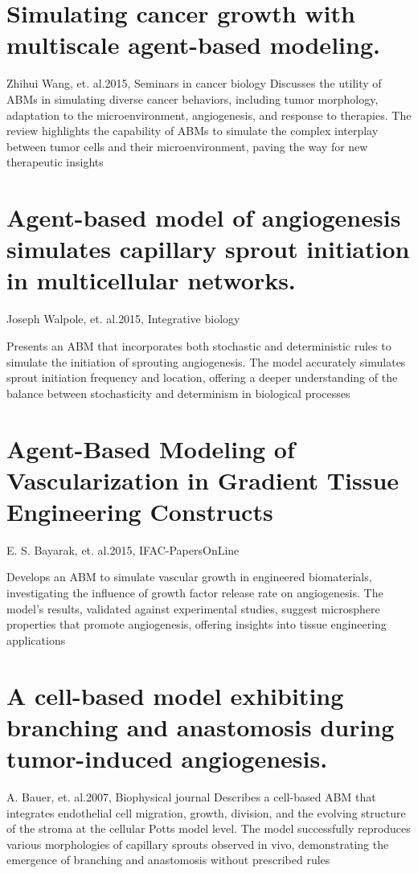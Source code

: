 \section{Simulating cancer growth with multiscale agent-based modeling.}{Zhihui Wang, et. al.}{2015, Seminars in cancer biology}
Discusses the utility of ABMs in simulating diverse cancer behaviors, including tumor morphology, adaptation to the microenvironment, angiogenesis, and response to therapies. The review highlights the capability of ABMs to simulate the complex interplay between tumor cells and their microenvironment, paving the way for new therapeutic insights \cite{Wang2015}

\section{Agent-based model of angiogenesis simulates capillary sprout initiation in multicellular networks.}{Joseph Walpole, et. al.}{2015, Integrative biology}

Presents an ABM that incorporates both stochastic and deterministic rules to simulate the initiation of sprouting angiogenesis. The model accurately simulates sprout initiation frequency and location, offering a deeper understanding of the balance between stochasticity and determinism in biological processes \cite{Walpole2015}


\section{Agent-Based Modeling of Vascularization in Gradient Tissue Engineering Constructs}{E. S. Bayarak, et. al.}{2015, IFAC-PapersOnLine}

Develops an ABM to simulate vascular growth in engineered biomaterials, investigating the influence of growth factor release rate on angiogenesis. The model's results, validated against experimental studies, suggest microsphere properties that promote angiogenesis, offering insights into tissue engineering applications \cite{Bayrak2015}

\section{A cell-based model exhibiting branching and anastomosis during tumor-induced angiogenesis.}{A. Bauer, et. al.}{2007, Biophysical journal}
Describes a cell-based ABM that integrates endothelial cell migration, growth, division, and the evolving structure of the stroma at the cellular Potts model level. The model successfully reproduces various morphologies of capillary sprouts observed in vivo, demonstrating the emergence of branching and anastomosis without prescribed rules \cite{Bauer2007a}


